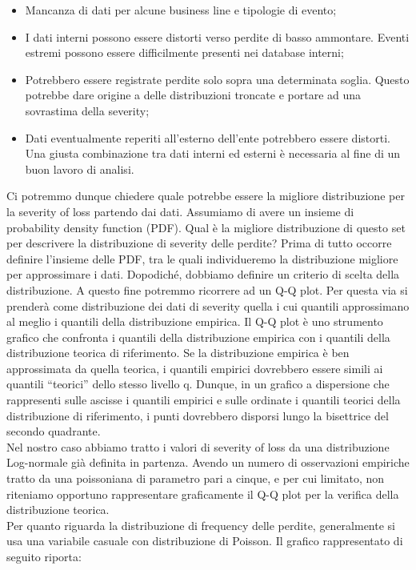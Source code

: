 \documentclass[titlepage]{article}
\begin{document}
\begin{itemize}
{\begin{itemize}
\item Mancanza di dati per alcune business line e tipologie di evento;
\item 	I dati interni possono essere distorti verso perdite di basso ammontare. Eventi estremi possono essere difficilmente presenti nei database interni;
\item 	Potrebbero essere registrate perdite solo sopra una determinata soglia. Questo potrebbe dare origine a delle distribuzioni troncate e portare ad una sovrastima della severity;
\item 	Dati eventualmente reperiti all’esterno dell’ente potrebbero essere distorti. Una giusta combinazione tra dati interni ed esterni è necessaria al fine di un buon lavoro di analisi. 
 \end{itemize}
Ci potremmo dunque chiedere quale potrebbe essere la migliore distribuzione per la severity of loss partendo dai dati. Assumiamo di avere un insieme di probability density function (PDF). Qual è la migliore distribuzione di questo set per descrivere la distribuzione di severity delle perdite? Prima di tutto occorre definire l’insieme delle PDF, tra le quali individueremo la distribuzione migliore per approssimare i dati. Dopodiché, dobbiamo definire un criterio di scelta della distribuzione. A questo fine potremmo ricorrere ad un Q-Q plot. Per questa via si prenderà come distribuzione dei dati di severity quella i cui quantili approssimano al meglio i quantili della distribuzione empirica.  Il Q-Q plot è uno strumento grafico che confronta i quantili della distribuzione empirica con i quantili della distribuzione teorica di riferimento. Se la distribuzione empirica è ben approssimata da quella teorica, i quantili empirici dovrebbero essere simili ai quantili “teorici” dello stesso livello q. Dunque, in un grafico a dispersione che rappresenti sulle ascisse i quantili empirici e sulle ordinate i quantili teorici della distribuzione di riferimento, i punti dovrebbero disporsi lungo la bisettrice del secondo quadrante. 
\\
Nel nostro caso abbiamo tratto i valori di severity of loss da una distribuzione Log-normale già definita in partenza. Avendo un numero di osservazioni empiriche tratto da una poissoniana di parametro pari a cinque, e per cui limitato, non riteniamo opportuno rappresentare graficamente il Q-Q plot per la verifica della distribuzione teorica.\\
Per quanto riguarda la distribuzione di frequency delle perdite, generalmente si usa una variabile casuale con distribuzione di Poisson. Il grafico rappresentato di seguito riporta:
}
\end{itemize}
\end{document}
